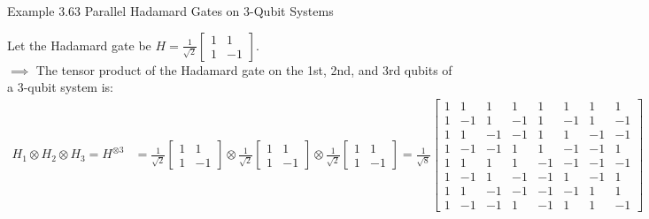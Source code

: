 \documentclass{book}
\begin{document}
\begin{egBox}{Example 3.6}{3 Parallel Hadamard Gates on 3-Qubit Systems}
    \raggedright
    Let the Hadamard gate be $H = \frac{1}{\sqrt{2}}\begin{bmatrix} 1 & 1 \\ 1 & -1 \end{bmatrix}$.\\
    $\implies$ The tensor product of the Hadamard gate on the 1st, 2nd, and 3rd qubits of a 3-qubit system is:
    \begin{align*}
        H_1 \otimes H_2 \otimes H_3 = H^{\otimes 3} &= \frac{1}{\sqrt{2}}\begin{bmatrix} 1 & 1 \\ 1 & -1 \end{bmatrix} \otimes \frac{1}{\sqrt{2}}\begin{bmatrix} 1 & 1 \\ 1 & -1 \end{bmatrix} \otimes \frac{1}{\sqrt{2}}\begin{bmatrix} 1 & 1 \\ 1 & -1 \end{bmatrix}= \frac{1}{\sqrt{8}}\begin{bmatrix} 1 & 1 & 1 & 1 & 1 & 1 & 1 & 1 \\ 1 & -1 & 1 & -1 & 1 & -1 & 1 & -1 \\ 1 & 1 & -1 & -1 & 1 & 1 & -1 & -1 \\ 1 & -1 & -1 & 1 & 1 & -1 & -1 & 1 \\ 1 & 1 & 1 & 1 & -1 & -1 & -1 & -1 \\ 1 & -1 & 1 & -1 & -1 & 1 & -1 & 1 \\ 1 & 1 & -1 & -1 & -1 & -1 & 1 & 1 \\ 1 & -1 & -1 & 1 & -1 & 1 & 1 & -1 \end{bmatrix}
    \end{align*}
\end{egBox}
\end{document}
